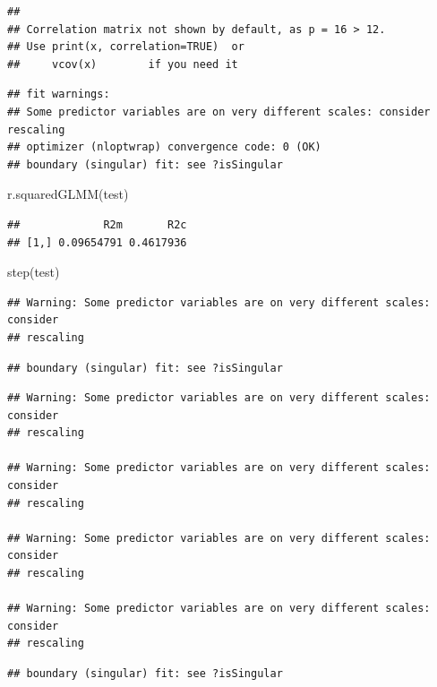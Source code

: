 \documentclass[
  12pt,
]{article}
\newenvironment{Shaded}{\begin{snugshade}}{\end{snugshade}}
\newcommand{\FunctionTok}[1]{\textcolor[rgb]{0.00,0.00,0.00}{#1}}
\newcommand{\NormalTok}[1]{#1}
\begin{document}
\begin{verbatim}
## 
## Correlation matrix not shown by default, as p = 16 > 12.
## Use print(x, correlation=TRUE)  or
##     vcov(x)        if you need it
\end{verbatim}

\begin{verbatim}
## fit warnings:
## Some predictor variables are on very different scales: consider rescaling
## optimizer (nloptwrap) convergence code: 0 (OK)
## boundary (singular) fit: see ?isSingular
\end{verbatim}

\begin{Shaded}
\begin{Highlighting}[]
\FunctionTok{r.squaredGLMM}\NormalTok{(test)}
\end{Highlighting}
\end{Shaded}

\begin{verbatim}
##             R2m       R2c
## [1,] 0.09654791 0.4617936
\end{verbatim}

\begin{Shaded}
\begin{Highlighting}[]
\FunctionTok{step}\NormalTok{(test)}
\end{Highlighting}
\end{Shaded}

\begin{verbatim}
## Warning: Some predictor variables are on very different scales: consider
## rescaling
\end{verbatim}

\begin{verbatim}
## boundary (singular) fit: see ?isSingular
\end{verbatim}

\begin{verbatim}
## Warning: Some predictor variables are on very different scales: consider
## rescaling

## Warning: Some predictor variables are on very different scales: consider
## rescaling

## Warning: Some predictor variables are on very different scales: consider
## rescaling

## Warning: Some predictor variables are on very different scales: consider
## rescaling
\end{verbatim}

\begin{verbatim}
## boundary (singular) fit: see ?isSingular
\end{verbatim}
\end{document}
